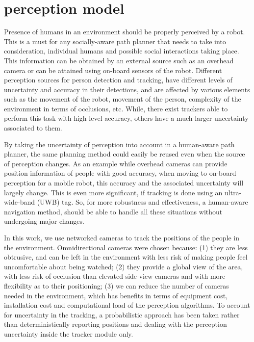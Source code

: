 \section{perception model}
\label{perception_model}


Presence of humans in an environment should be properly perceived by a robot. This is a must for any socially-aware path planner that needs to take into consideration, individual humans and possible social interactions taking place.%
 This information can be obtained by an external source such as an overhead camera or can be attained using on-board sensors of the robot. Different perception sources for person detection and tracking, have different levels of uncertainty and accuracy in their detections, and are affected by various elements such as the movement of the robot, movement of the person, complexity of the environment in terms of occlusions, etc. While, there exist trackers able to perform this task with high level accuracy, others have a much larger uncertainty associated to them. 

By taking the uncertainty of perception into account in a human-aware path planner, the same planning method could easily be reused even when the source of perception changes. As an example while overhead cameras can provide position information of people with good accuracy, when moving to on-board perception for a mobile robot, this accuracy and the associated uncertainty will largely change. This is even more significant, if tracking is done using an ultra-wide-band (UWB) tag. So, for more robustness and effectiveness, a human-aware navigation method, should be able to handle all these situations without undergoing major changes.

In this work, we use networked cameras to track the positions of the people in the environment. Omnidirectional cameras were chosen because: (1) they are less obtrusive, and can be left in the environment with less risk
of making people feel uncomfortable about being watched; (2) they provide a global view of the area, with less risk of occlusion than elevated side-view cameras and with more flexibility as to their positioning; (3) we can reduce the number of cameras needed in the environment, which has benefits in terms of equipment cost, installation cost and computational load of the perception algorithms. To account for uncertainty in the tracking, a probabilistic approach has been taken rather than deterministically reporting positions and dealing with the perception uncertainty inside the tracker module only.

